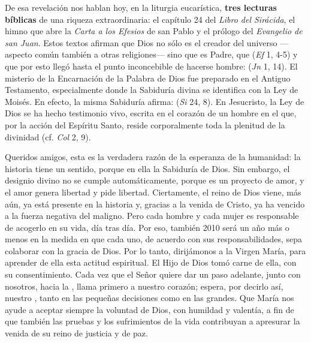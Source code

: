 De esa revelación nos hablan hoy, en la liturgia eucarística, \textbf{tres lecturas bíblicas} de una riqueza extraordinaria: el capítulo 24 del \emph{Libro del Sirácida}, el himno que abre la \emph{Carta a los Efesios} de san Pablo y el prólogo del \emph{Evangelio de san Juan}. Estos textos afirman que Dios no sólo es el creador del universo ---aspecto común también a otras religiones--- sino que es Padre, que  (\emph{Ef} 1, 4-5) y que por esto llegó hasta el punto inconcebible de hacerse hombre:  (\emph{Jn} 1, 14). El misterio de la Encarnación de la Palabra de Dios fue preparado en el Antiguo Testamento, especialmente donde la Sabiduría divina se identifica con la Ley de Moisés. En efecto, la misma Sabiduría afirma:  (\emph{Si} 24, 8). En Jesucristo, la Ley de Dios se ha hecho testimonio vivo, escrita en el corazón de un hombre en el que, por la acción del Espíritu Santo, reside corporalmente toda la plenitud de la divinidad (cf. \emph{Col} 2, 9).

Queridos amigos, esta es la verdadera razón de la esperanza de la humanidad: la historia tiene un sentido, porque en ella  la Sabiduría de Dios. Sin embargo, el designio divino no se cumple automáticamente, porque es un proyecto de amor, y el amor genera libertad y pide libertad. Ciertamente, el reino de Dios viene, más aún, ya está presente en la historia y, gracias a la venida de Cristo, ya ha vencido a la fuerza negativa del maligno. Pero cada hombre y cada mujer es responsable de acogerlo en su vida, día tras día. Por eso, también 2010 será un año más o menos  en la medida en que cada uno, de acuerdo con sus responsabilidades, sepa colaborar con la gracia de Dios. Por lo tanto, dirijámonos a la Virgen María, para aprender de ella esta actitud espiritual. El Hijo de Dios tomó carne de ella, con su consentimiento. Cada vez que el Señor quiere dar un paso adelante, junto con nosotros, hacia la , llama primero a nuestro corazón; espera, por decirlo así, nuestro , tanto en las pequeñas decisiones como en las grandes. Que María nos ayude a aceptar siempre la voluntad de Dios, con humildad y valentía, a fin de que también las pruebas y los sufrimientos de la vida contribuyan a apresurar la venida de su reino de justicia y de paz.

